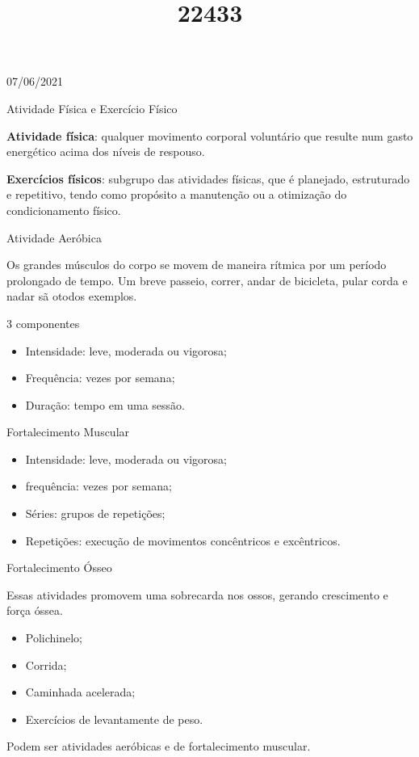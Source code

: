 \documentclass{SchoolBook}
\begin{document}
    \begin{day}{07/06/2021}
        \title{2}{Atividade Física e Exercício Físico}
        
        \noindent\textbf{Atividade física}: qualquer movimento corporal voluntário que resulte num gasto energético acima dos níveis de respouso.
        
        \noindent\textbf{Exercícios físicos}: subgrupo das atividades físicas, que é planejado, estruturado e repetitivo, tendo como propósito a manutenção ou a otimização do condicionamento físico.
        
        \title{2}{Atividade Aeróbica}
        
        Os grandes músculos do corpo se movem de maneira rítmica por um período prolongado de tempo. Um breve passeio, correr, andar de bicicleta, pular corda e nadar sã otodos exemplos.
        
        \title{4}{3 componentes}
        \vspace{6pt}
        \begin{itemize}[nosep]
            \item Intensidade: leve, moderada ou vigorosa;
            \item Frequência: vezes por semana;
            \item Duração: tempo em uma sessão.
        \end{itemize}
        
        \title{3}{Fortalecimento Muscular}
        
        \begin{itemize}
            \item Intensidade: leve, moderada ou vigorosa;
            \item frequência: vezes por semana;
            \item Séries: grupos de repetições;
            \item Repetições: execução de movimentos concêntricos e excêntricos.
        \end{itemize}
        
        \title{3}{Fortalecimento Ósseo}
        
        Essas atividades promovem uma sobrecarda nos ossos, gerando crescimento e força óssea.
        
        \vspace{12pt}
        \begin{itemize}[nosep]
            \item Polichinelo;
            \item Corrida;
            \item Caminhada acelerada;
            \item Exercícios de levantamente de peso.
        \end{itemize}
        
        Podem ser atividades aeróbicas e de fortalecimento muscular.
    \end{day}
    
\end{document}
